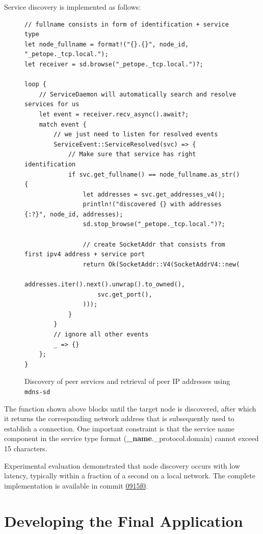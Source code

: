 \documentclass[a4paper, 10pt]{article}
\let\oldsection\section
\renewcommand{\section}{
  \clearpage
  \oldsection
}
\begin{document}
\newpage

Service discovery is implemented as follows:

\begin{figure}[H]
  \begin{verbatim}
// fullname consists in form of identification + service type
let node_fullname = format!("{}.{}", node_id, "_petope._tcp.local.");
let receiver = sd.browse("_petope._tcp.local.")?;

loop {
    // ServiceDaemon will automatically search and resolve services for us
    let event = receiver.recv_async().await?;
    match event {
        // we just need to listen for resolved events
        ServiceEvent::ServiceResolved(svc) => {
            // Make sure that service has right identification
            if svc.get_fullname() == node_fullname.as_str() {
                let addresses = svc.get_addresses_v4();
                println!("discovered {} with addresses {:?}", node_id, addresses);
                sd.stop_browse("_petope._tcp.local.")?;

                // create SocketAddr that consists from first ipv4 address + service port
                return Ok(SocketAddr::V4(SocketAddrV4::new(
                    addresses.iter().next().unwrap().to_owned(),
                    svc.get_port(),
                )));
            }
        }
        // ignore all other events
        _ => {}
    };
}
  \end{verbatim}
  \caption{Discovery of peer services and retrieval of peer IP addresses using \texttt{mdns-sd}}
\end{figure}

The function shown above blocks until the target node is discovered, after which it returns the corresponding
network address that is subsequently used to establish a connection. One important constraint is that the
service name component in the service type format
(\textbf{\_name}.\_protocol.domain) cannot exceed 15 characters.

Experimental evaluation demonstrated that node discovery occurs with low latency, typically within a fraction
of a second on a local network. The complete implementation is available in commit
\href{https://github.com/dankmolot/petope/tree/0915f06ad2b44db91ace9968bc6654252927c25b}{0915f0}.

\section{Developing the Final Application}
\end{document}
